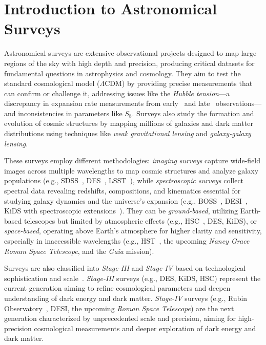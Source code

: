 \section{Introduction to Astronomical Surveys}
Astronomical surveys are extensive observational projects designed to map large regions of the sky with high depth and precision, producing critical datasets for fundamental questions in astrophysics and cosmology. They aim to test the standard cosmological model ($\Lambda$CDM) by providing precise measurements that can confirm or challenge it, addressing issues like the \emph{Hubble tension}—a discrepancy in expansion rate measurements from early~\citep{2016A&A...594A..13P} and late~\citep{2019ApJ...876...85R} observations—and inconsistencies in parameters like $S_8$. Surveys also study the formation and evolution of cosmic structures by mapping millions of galaxies and dark matter distributions using techniques like \emph{weak gravitational lensing} and \emph{galaxy-galaxy lensing}\citep{2013MNRAS.432.1544M, 2022PhRvD.105b3520A}.

These surveys employ different methodologies: \emph{imaging surveys} capture wide-field images across multiple wavelengths to map cosmic structures and analyze galaxy populations (e.g., SDSS~\citep{2019BAAS...51g.274K}, DES~\citep{2018ApJS..239...18A}, LSST~\citep{2019ApJ...873..111I}), while \emph{spectroscopic surveys} collect spectral data revealing redshifts, compositions, and kinematics essential for studying galaxy dynamics and the universe's expansion (e.g., BOSS~\citep{2013AJ....145...10D}, DESI~\citep{2016arXiv161100036D}, KiDS with spectroscopic extensions~\citep{2013Msngr.154...44D}). They can be \emph{ground-based}, utilizing Earth-based telescopes but limited by atmospheric effects (e.g., HSC~\citep{2018PASJ...70S...4A}, DES, KiDS), or \emph{space-based}, operating above Earth's atmosphere for higher clarity and sensitivity, especially in inaccessible wavelengths (e.g., HST~\citep{2001ApJ...553...47F}, the upcoming \emph{Nancy Grace Roman Space Telescope}\citep{2015arXiv150303757S}, and the \emph{Gaia} mission\citep{2016A&A...595A...2G}).

Surveys are also classified into \emph{Stage-III} and \emph{Stage-IV} based on technological sophistication and scale~\citep{2006astro.ph..9591A}. \emph{Stage-III} surveys (e.g., DES, KiDS, HSC) represent the current generation aiming to refine cosmological parameters and deepen understanding of dark energy and dark matter. \emph{Stage-IV} surveys (e.g., Rubin Observatory~\citep{2019ApJ...873..111I}, DESI, the upcoming \emph{Roman Space Telescope}) are the next generation characterized by unprecedented scale and precision, aiming for high-precision cosmological measurements and deeper exploration of dark energy and dark matter.

